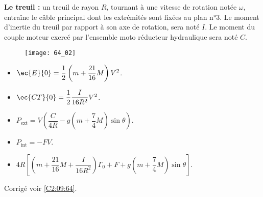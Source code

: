 \textbf{Le treuil :} un treuil de rayon $R$, tournant à une vitesse de rotation notée $\omega$, entraîne le câble principal
dont les extrémités sont fixées au plan n°3. Le moment d’inertie du treuil par rapport à son axe de rotation, sera noté $I$.
Le moment du couple moteur exercé par l’ensemble moto réducteur hydraulique sera noté $C$.

\begin{figure}[H]
\centering
\texttt{[image: 64\_02]}
\end{figure}


\ifprof
\else
\fi

\ifprof
\else
\fi

\ifprof
\else
\fi

\ifprof
\else
\fi

\ifprof
\else
\fi



\ifprof
\else
\footnotesize
\begin{itemize}
\item $\ec{E}{0}=\dfrac{1}{2}\left(m+\dfrac{21}{16}M \right)V^2$.
\item $\ec{CT}{0}=\dfrac{1}{2}\dfrac{I}{16R^2}V^2$.
\item $P_{\text{ext}}=V\left(\dfrac{C}{4R}-g\left(m+\dfrac{7}{4}M \right)\sin\theta\right)$.
\item $P_{\text{int}}=-FV$.
\item $4R\left[\left(m+\dfrac{21}{16}M+\dfrac{I}{16R^2}\right)\Gamma_0 +F+g\left( m+\dfrac{7}{4}M\right)\sin \theta \right]$.
\end{itemize}
\normalsize
\begin{flushright}
\footnotesize{Corrigé  voir \ref{C2:09:64}.}
\end{flushright}%
\fi